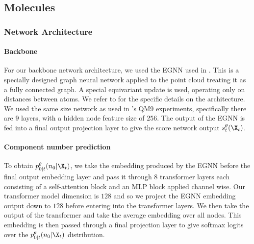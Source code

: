 \subsection{Molecules}

\subsubsection{Network Architecture}
\paragraph{Backbone}
For our backbone network architecture, we used the EGNN used in \cite{hoogeboom2022equivariant}. This is a specially designed graph neural network applied to the point cloud treating it as a fully connected graph. A special equivariant update is used, operating only on distances between atoms. We refer to \cite{hoogeboom2022equivariant} for the specific details on the architecture. We used the same size network as used in \cite{hoogeboom2022equivariant}'s QM9 experiments, specifically there are $9$ layers, with a hidden node feature size of $256$. The output of the EGNN is fed into a final output projection layer to give the score network output $s_t^\theta(\X_t)$.

\paragraph{Component number prediction}
To obtain $p_{0|t}^\theta(n_0 | \X_t)$,  we take the embedding produced by the EGNN before the final output embedding layer and pass it through 8 transformer layers each consisting of a self-attention block and an MLP block applied channel wise. Our transformer model dimension is $128$ and so we project the EGNN embedding output down to $128$ before entering into the transformer layers. We then take the output of the transformer and take the average embedding over all nodes. This embedding is then passed through a final projection layer to give softmax logits over the $p_{0|t}^\theta(n_0 | \X_t)$ distribution.

